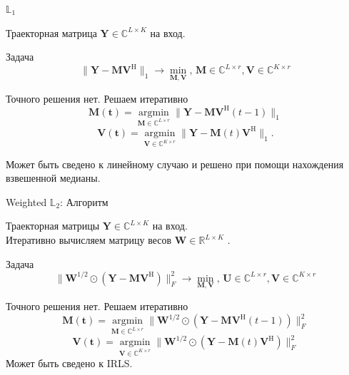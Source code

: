 \documentclass[ucs, notheorems, handout]{beamer}
\DeclareMathOperator*{\argmin}{argmin}
\begin{document}
\begin{frame}{$\mathbb{L}_1$}

Траекторная матрица $\mathbf{Y} \in \mathbb{C}^{L\times K}$ на вход.
\begin{block}{Задача}
\begin{equation*}
	\|\mathbf{Y}-\mathbf{M}\mathbf{V}^{\mathrm{H}}\|_1 \longrightarrow \min_{\mathbf{M},\mathbf{V}}, \, \mathbf{M} \in \mathbb{C}^{L\times r}, \mathbf{V} \in \mathbb{C}^{K\times r}
\end{equation*}
\end{block}
Точного решения нет. Решаем итеративно 
\begin{equation*}
	 \mathbf{M(t)} = \argmin\limits_{\mathbf{M}\in \mathbb{C}^{L\times r}} \|\mathbf{Y} - \mathbf{M}\mathbf{V}^\mathrm{H}(t - 1)\|_1
\end{equation*}
$$\mathbf{V(t)} = \argmin\limits_{\mathbf{V}\in \mathbb{C}^{K\times r}} \|\mathbf{Y} - \mathbf{M}(t)\mathbf{V}^\mathrm{H}\|_1.$$

Может быть сведено к линейному случаю и решено при помощи нахождения взвешенной медианы.
    \note{}
\end{frame}


\begin{frame}{Weighted $\mathbb{L}_2$: Алгоритм}

Траекторная матрицы $\mathbf{Y} \in \mathbb{C}^{L\times K}$ на вход.\\ 
\vspace{1em}
Итеративно вычисляем матрицу весов $\mathbf{W} \in \mathbb{R}^{L\times K}$ .
\begin{block}{Задача}
\begin{equation*}
	\|\mathbf{W}^{1/2}\odot(\mathbf{Y}-\mathbf{M}\mathbf{V}^{\mathrm{H}})\|^{2}_F \longrightarrow \min_{\mathbf{M},\mathbf{V}}, \, \mathbf{U} \in \mathbb{C}^{L\times r}, \mathbf{V} \in \mathbb{C}^{K\times r}
\end{equation*}
\end{block}
Точного решения нет. Решаем итеративно
\begin{equation*}
	\mathbf{M(t)} = \argmin\limits_{\mathbf{M}\in \mathbb{C}^{L\times r}} \|\mathbf{W}^{1/2}\odot(\mathbf{Y}-\mathbf{M}\mathbf{V}^{\mathrm{H}}(t-1))\|^2_F
\end{equation*}
$$\mathbf{V(t)} = \argmin\limits_{\mathbf{V}\in \mathbb{C}^{K\times r}} \|\mathbf{W}^{1/2}\odot(\mathbf{Y}-\mathbf{M}(t)\mathbf{V}^{\mathrm{H}})\|^2_F$$
Может быть сведено к IRLS.

    \note{}
\end{frame}
\end{document}
